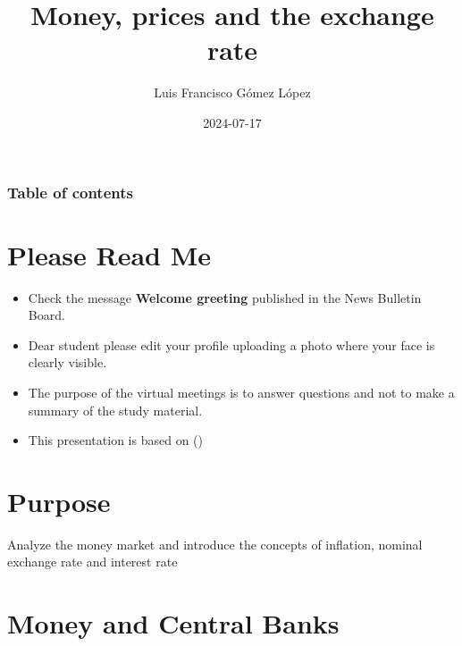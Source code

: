 \documentclass[
  ignorenonframetext,
]{beamer}
\title{Money, prices and the exchange rate}
\author{Luis Francisco Gómez López}
\date{2024-07-17}
\institute{FAEDIS}
\renewcommand*\contentsname{Table of contents}
\newcommand\contentsname{Table of contents}
\begin{document}
\frame{\titlepage}

\renewcommand*\contentsname{Table of contents}
\begin{frame}[allowframebreaks]
  \frametitle{Table of contents}
  \tableofcontents[hideallsubsections]
\end{frame}

\section{Please Read Me}\label{please-read-me}

\begin{frame}{}
\label{section}
\begin{itemize}
\item
  Check the message \textbf{Welcome greeting} published in the News
  Bulletin Board.
\item
  Dear student please edit your profile uploading a photo where your
  face is clearly visible.
\item
  The purpose of the virtual meetings is to answer questions and not to
  make a summary of the study material.
\item
  This presentation is based on
  ()
\end{itemize}
\end{frame}

\section{Purpose}\label{purpose}

\begin{frame}{}
\label{section-1}
Analyze the money market and introduce the concepts of inflation,
nominal exchange rate and interest rate
\end{frame}

\section{Money and Central Banks}\label{money-and-central-banks}
\end{document}
